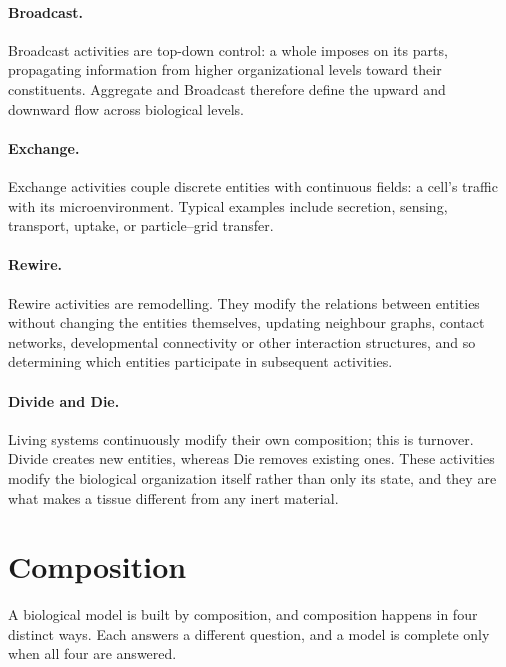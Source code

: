 \documentclass[11pt]{article}
\begin{document}
\paragraph{Broadcast.}
Broadcast activities are top-down control: a whole imposes on its parts, propagating
information from higher organizational levels toward their constituents. Aggregate and
Broadcast therefore define the upward and downward flow across biological levels.

\paragraph{Exchange.}
Exchange activities couple discrete entities with continuous fields: a cell's traffic
with its microenvironment. Typical examples include secretion, sensing, transport,
uptake, or particle--grid transfer.

\paragraph{Rewire.}
Rewire activities are remodelling. They modify the relations between entities without
changing the entities themselves, updating neighbour graphs, contact networks,
developmental connectivity or other interaction structures, and so determining which
entities participate in subsequent activities.

\paragraph{Divide and Die.}
Living systems continuously modify their own composition; this is turnover. Divide
creates new entities, whereas Die removes existing ones. These activities modify the
biological organization itself rather than only its state, and they are what makes a
tissue different from any inert material.

\section{Composition}\label{sec:composition}

A biological model is built by composition, and composition happens in four
distinct ways. Each answers a different question, and a model is complete only
when all four are answered.
\end{document}
